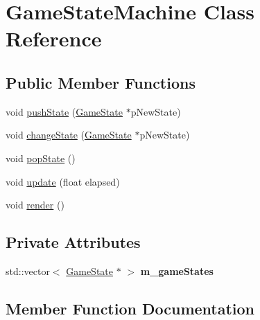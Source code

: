 \hypertarget{class_game_state_machine}{}\section{Game\+State\+Machine Class Reference}
\label{class_game_state_machine}
\subsection*{Public Member Functions}
\begin{DoxyCompactItemize}
\item 
void \mbox{\hyperlink{class_game_state_machine_ac5c2d4a64d78686af8629baa4e461c54}{push\+State}} (\mbox{\hyperlink{class_game_state}{Game\+State}} $\ast$p\+New\+State)
\item 
void \mbox{\hyperlink{class_game_state_machine_a8db2a23529a8d14a46f5de82ee5fe741}{change\+State}} (\mbox{\hyperlink{class_game_state}{Game\+State}} $\ast$p\+New\+State)
\item 
void \mbox{\hyperlink{class_game_state_machine_a691905effed30b630c3971fb5bbfcc4f}{pop\+State}} ()
\item 
void \mbox{\hyperlink{class_game_state_machine_ada04eb6547853c56262fc9f8b8cd7a04}{update}} (float elapsed)
\item 
void \mbox{\hyperlink{class_game_state_machine_abfad06d5c6aa2f7d96a18e405f6d56c5}{render}} ()
\end{DoxyCompactItemize}
\subsection*{Private Attributes}
\begin{DoxyCompactItemize}
\item 
\mbox{\label{class_game_state_machine_a425a33b1d57229faa557e3680efab1e7}} 
std\+::vector$<$ \mbox{\hyperlink{class_game_state}{Game\+State}} $\ast$ $>$ {\bfseries m\+\_\+game\+States}
\end{DoxyCompactItemize}


\subsection{Member Function Documentation}
\mbox{\label{class_game_state_machine_a8db2a23529a8d14a46f5de82ee5fe741}} 
